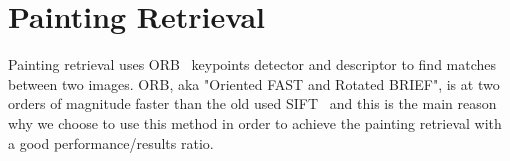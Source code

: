 \section{Painting Retrieval}
Painting retrieval uses ORB~\cite{orb} keypoints detector and descriptor to find matches between two images. ORB, aka "Oriented FAST and Rotated BRIEF", is at two orders of magnitude faster than the old used SIFT~\cite{sift} and this is the main reason why we choose to use this method in order to achieve the painting retrieval with a good performance/results ratio.